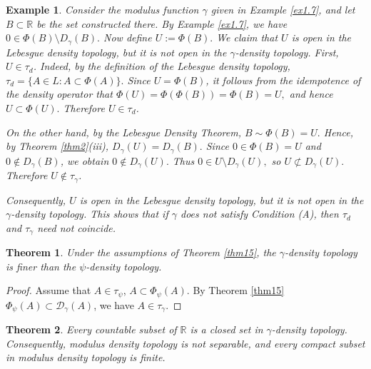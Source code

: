 \documentclass{amsart}
\newtheorem{theorem}{Theorem}
\theoremstyle{plain}
\newtheorem{example}{Example}
\numberwithin{equation}{section}
\begin{document}
\begin{example}
Consider the modulus function $\gamma$ given in Example \ref{ex1.7}, and let $B \subset \mathbb{R}$ be the set constructed there. By Example \ref{ex1.7}, we have $ 0 \in \Phi(B) \setminus D_{\gamma}(B).$
Now define $ U:=\Phi(B). $
We claim that $U$ is open in the Lebesgue density topology, but it is not open in the $\gamma$-density topology.
First, $U \in \tau_d$. Indeed, by the definition of the Lebesgue density topology,
$\tau_d=\{A \in L : A \subset \Phi(A)\}.$
Since $U=\Phi(B)$, it follows from the idempotence of the density operator that $ \Phi(U)=\Phi(\Phi(B))=\Phi(B)=U, $
and hence $ U \subset \Phi(U).$
Therefore $U \in \tau_d$.

On the other hand, by the Lebesgue Density Theorem,
$ B \sim \Phi(B)=U. $
Hence, by Theorem \ref{thm2}(iii),
$D_{\gamma}(U)=D_{\gamma}(B).$ Since $0 \in \Phi(B)=U$ and $0 \notin D_{\gamma}(B)$, we obtain
$ 0 \notin D_{\gamma}(U). $
Thus $ 0 \in U \setminus D_{\gamma}(U), $
so $ U \not\subset D_{\gamma}(U).$
Therefore $U \notin \tau_{\gamma}$.

Consequently, $U$ is open in the Lebesgue density topology, but it is not open in the $\gamma$-density topology. This shows that if $\gamma$ does not satisfy Condition (A), then $\tau_d$ and $\tau_{\gamma}$ need not coincide.
\end{example}
\begin{theorem}
Under the assumptions of Theorem \ref{thm15}, the $\gamma$-density topology is finer than the $\psi$-density topology.
\end{theorem}
\begin{proof}
    Assume that $A\in \tau_\psi$, $A\subset \Phi_\psi(A)$. By Theorem \ref{thm15} $\Phi_\psi(A)\subset \mathcal{D}_\gamma(A)$, we have $A\in \tau_\gamma.$ 
\end{proof}
\begin{theorem}\label{thm2.10}
Every countable subset of $\mathbb{R}$ is a closed set in $\gamma$-density topology. Consequently, modulus density topology is not separable, and every compact subset in modulus density topology is finite.
\end{theorem}
\end{document}
